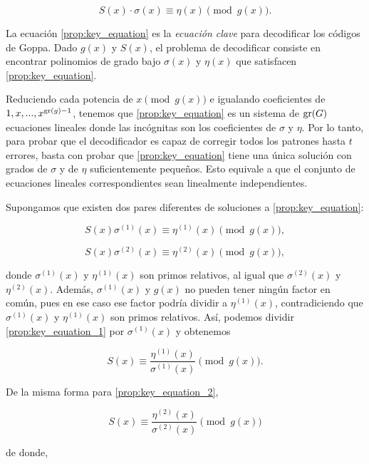 \begin{equation}
    \label{prop:key_equation}
    S(x) \cdot \sigma(x) \equiv \eta(x) \pmod{g(x)}.
\end{equation}

La ecuación \eqref{prop:key_equation} es la \emph{ecuación clave} para decodificar los códigos de Goppa. Dado $g(x)$ y $S(x)$, el problema de decodificar consiste en encontrar polinomios de grado bajo $\sigma(x)$ y $\eta(x)$ que satisfacen \eqref{prop:key_equation}.

Reduciendo cada potencia de $x \pmod{g(x)}$ e igualando coeficientes de $1, x, ..., x^{\operatorname{gr}(g) - 1}$, tenemos que \eqref{prop:key_equation} es un sistema de $\operatorname{gr}(G)$ ecuaciones lineales donde las incógnitas son los coeficientes de $\sigma$ y $\eta$. Por lo tanto, para probar que el decodificador es capaz de corregir todos los patrones hasta $t$ errores, basta con probar que \eqref{prop:key_equation} tiene una única solución con grados de $\sigma$ y de $\eta$ suficientemente pequeños. Esto equivale a que el conjunto de ecuaciones lineales correspondientes sean linealmente independientes.

Supongamos que existen dos pares diferentes de soluciones a \eqref{prop:key_equation}:

\begin{equation}
    \label{prop:key_equation_1}
    S(x) \sigma^{(1)}(x) \equiv \eta^{(1)}(x) \pmod{g(x)},
\end{equation}

\begin{equation}
    \label{prop:key_equation_2}
    S(x) \sigma^{(2)}(x) \equiv \eta^{(2)}(x) \pmod{g(x)},
\end{equation}

donde $\sigma^{(1)}(x)$ y $\eta^{(1)}(x)$ son primos relativos, al igual que $\sigma^{(2)}(x)$ y $\eta^{(2)}(x)$. Además, $\sigma^{(1)}(x)$ y $g(x)$ no pueden tener ningún factor en común, pues en ese caso ese factor podría dividir a $\eta^{(1)}(x)$, contradiciendo que $\sigma^{(1)}(x)$ y $\eta^{(1)}(x)$ son primos relativos. Así, podemos dividir \eqref{prop:key_equation_1} por $\sigma^{(1)}(x)$ y obtenemos

$$S(x) \equiv \frac{\eta^{(1)}(x)}{\sigma^{(1)}(x)} \pmod{g(x)}.$$

De la misma forma para \eqref{prop:key_equation_2},

$$S(x) \equiv \frac{\eta^{(2)}(x)}{\sigma^{(2)}(x)} \pmod{g(x)}$$

de donde,

